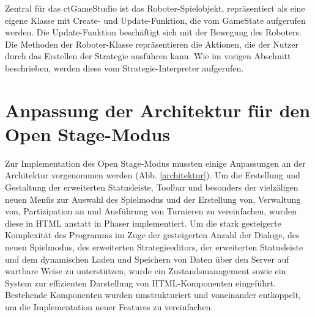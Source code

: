 Zentral für das ctGameStudio ist das Roboter-Spielobjekt, repräsentiert als eine eigene Klasse mit
Create- und Update-Funktion, die vom GameState aufgerufen werden. Die Update-Funktion beschäftigt
sich mit der Bewegung des Roboters. Die Methoden der Roboter-Klasse repräsentieren die Aktionen, die
der Nutzer durch das Erstellen der Strategie ausführen kann. Wie im vorigen Abschnitt beschrieben,
werden diese vom Strategie-Interpreter aufgerufen.


\section{Anpassung der Architektur für den Open Stage-Modus}

Zur Implementation des Open Stage-Modus mussten einige Anpassungen an der Architektur vorgenommen
werden (Abb. \ref{architektur}). Um die Erstellung und Gestaltung der erweiterten Statusleiste,
Toolbar und besonders der vielzäligen neuen Menüs zur Auswahl des Spielmodus und der Erstellung von,
Verwaltung von, Partizipation an und Ausführung von Turnieren zu vereinfachen, wurden diese in HTML
anstatt in Phaser implementiert. Um die stark gesteigerte Komplexität des Programms im Zuge der
gesteigerten Anzahl der Dialoge, des neuen Spielmodus, des erweiterten Strategieeditors, der
erweiterten Statusleiste und dem dynamischen Laden und Speichern von Daten über den Server auf
wartbare Weise zu unterstützen, wurde ein Zustandsmanagement sowie ein System zur effizienten
Darstellung von HTML-Komponenten eingeführt. Bestehende Komponenten wurden umstrukturiert und
voneinander entkoppelt, um die Implementation neuer Features zu vereinfachen.

